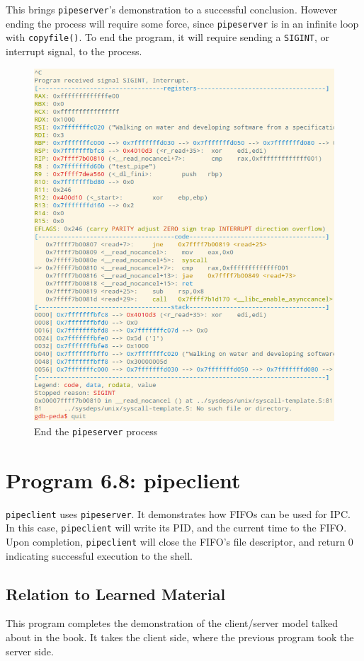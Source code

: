 \documentclass[letter,12pt,sffamily]{article}
\begin{document}
This brings \texttt{pipeserver}'s demonstration to a successful conclusion. However ending the process will require some force, since \texttt{pipeserver} is in an infinite loop with \texttt{copyfile()}.
To end the program, it will require sending a \texttt{SIGINT}, or interrupt signal, to the process.
\begin{figure}[H]
	\centering
	\includegraphics[width=1\linewidth]{./images/12}
	\caption[sigint]{End the \texttt{pipeserver} process}
	\label{fig:12}
\end{figure}
\section{Program 6.8: pipeclient}
\texttt{pipeclient} uses \texttt{pipeserver}. It demonstrates how FIFOs can be used for IPC. In this case, \texttt{pipeclient} will write its PID, and the current time to the FIFO.
Upon completion, \texttt{pipeclient} will close the FIFO's file descriptor, and return 0 indicating successful execution to the shell.
\subsection{Relation to Learned Material}
This program completes the demonstration of the client/server model talked about in the book. It takes the client side, where the previous program took the server side.
\end{document}
